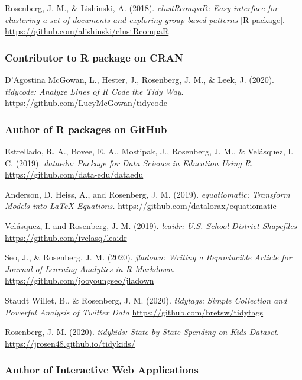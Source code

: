 \documentclass[
  14,
]{article}
\begin{document}
Rosenberg, J. M., \& Lishinski, A. (2018). \emph{clustRcompaR: Easy
interface for clustering a set of documents and exploring group-based
patterns} {[}R package{]}.
\url{https://github.com/alishinski/clustRcompaR}

\hypertarget{contributor-to-r-package-on-cran}{%
\subsubsection{Contributor to R package on
CRAN}\label{contributor-to-r-package-on-cran}}

D'Agostina McGowan, L., Hester, J., Rosenberg, J. M., \& Leek, J.
(2020). \emph{tidycode: Analyze Lines of R Code the Tidy Way}.
\url{https://github.com/LucyMcGowan/tidycode}

\hypertarget{author-of-r-packages-on-github}{%
\subsubsection{Author of R packages on
GitHub}\label{author-of-r-packages-on-github}}

Estrellado, R. A., Bovee, E. A., Mostipak, J., Rosenberg, J. M., \&
Velásquez, I. C. (2019). \emph{dataedu: Package for Data Science in
Education Using R}. \url{https://github.com/data-edu/dataedu}

Anderson, D. Heiss, A., and Rosenberg, J. M. (2019). \emph{equatiomatic:
Transform Models into LaTeX Equations.}
\url{https://github.com/datalorax/equatiomatic}

Velásquez, I. and Rosenberg, J. M. (2019). \emph{leaidr: U.S. School
District Shapefiles} \url{https://github.com/ivelasq/leaidr}

Seo, J., \& Rosenberg, J. M. (2020). \emph{jladown: Writing a
Reproducible Article for Journal of Learning Analytics in R Markdown}.
\url{https://github.com/jooyoungseo/jladown}

Staudt Willet, B., \& Rosenberg, J. M. (2020). \emph{tidytags: Simple
Collection and Powerful Analysis of Twitter Data}
\url{https://github.com/bretsw/tidytags}

Rosenberg, J. M. (2020). \emph{tidykids: State-by-State Spending on Kids
Dataset}. \url{https://jrosen48.github.io/tidykids/}

\hypertarget{author-of-interactive-web-applications}{%
\subsubsection{Author of Interactive Web
Applications}\label{author-of-interactive-web-applications}}
\end{document}
